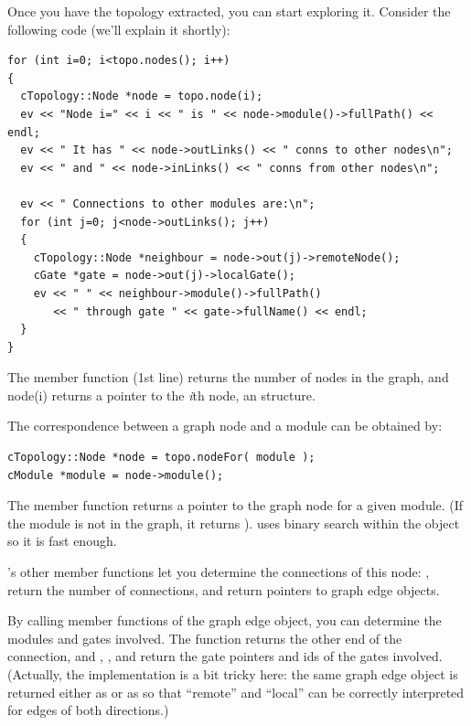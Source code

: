 Once you have the topology extracted, you can start exploring
it. Consider the following code (we'll explain it shortly):

\begin{verbatim}
for (int i=0; i<topo.nodes(); i++)
{
  cTopology::Node *node = topo.node(i);
  ev << "Node i=" << i << " is " << node->module()->fullPath() << endl;
  ev << " It has " << node->outLinks() << " conns to other nodes\n";
  ev << " and " << node->inLinks() << " conns from other nodes\n";

  ev << " Connections to other modules are:\n";
  for (int j=0; j<node->outLinks(); j++)
  {
    cTopology::Node *neighbour = node->out(j)->remoteNode();
    cGate *gate = node->out(j)->localGate();
    ev << " " << neighbour->module()->fullPath()
       << " through gate " << gate->fullName() << endl;
  }
}
\end{verbatim}

The  member function (1st line) returns the number of
nodes in the graph, and node(i) returns a pointer to the \textit{i}th
node, an  structure.


The correspondence between a graph node and a module can be obtained
by:

\begin{verbatim}
cTopology::Node *node = topo.nodeFor( module );
cModule *module = node->module();
\end{verbatim}


The  member function returns a pointer to the graph
node for a given module. (If the module is not in the graph, it
returns ).  uses binary search within the
 object so it is fast enough.


's other member functions let you determine the
connections of this node: ,  return
the number of connections,  and
 return pointers to graph edge objects.


By calling member functions of the graph edge object, you can
determine the modules and gates involved. The 
function returns the other end of the connection, and
, ,  and
 return the gate pointers and ids of the gates
involved. (Actually, the implementation is a bit tricky here: the same
graph edge object  is returned either as
 or as  so that ``remote''
and ``local'' can be correctly interpreted for edges of both
directions.)





